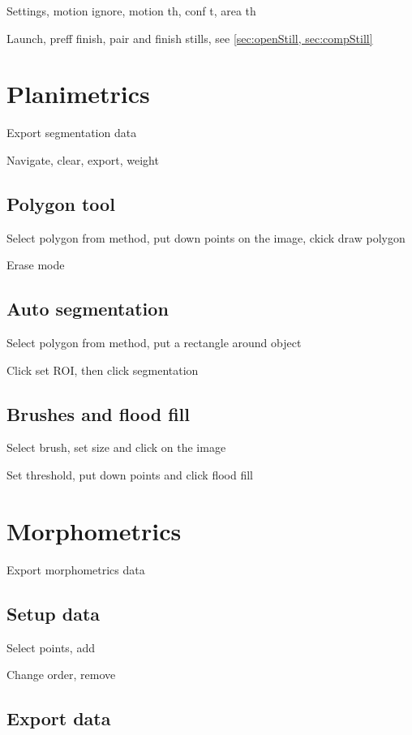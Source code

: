 \documentclass[10pt,a4paper,oneside]{report}             %
\begin{document}
Settings, motion ignore, motion th, conf t, area th

Launch, preff finish, pair and finish stills, see \autoref{sec:openStill, sec:compStill}

\section{Planimetrics}

Export segmentation data

Navigate, clear, export, weight

\subsection{Polygon tool}

Select polygon from method, put down points on the image, ckick draw polygon

Erase mode

\subsection{Auto segmentation}

Select polygon from method, put a rectangle around object

Click set ROI, then click segmentation

\subsection{Brushes and flood fill}

Select brush, set size and click on the image

Set threshold, put down points and click flood fill

\section{Morphometrics}

Export morphometrics data

\subsection{Setup data}

Select points, add

Change order, remove

\subsection{Export data}
\end{document}
